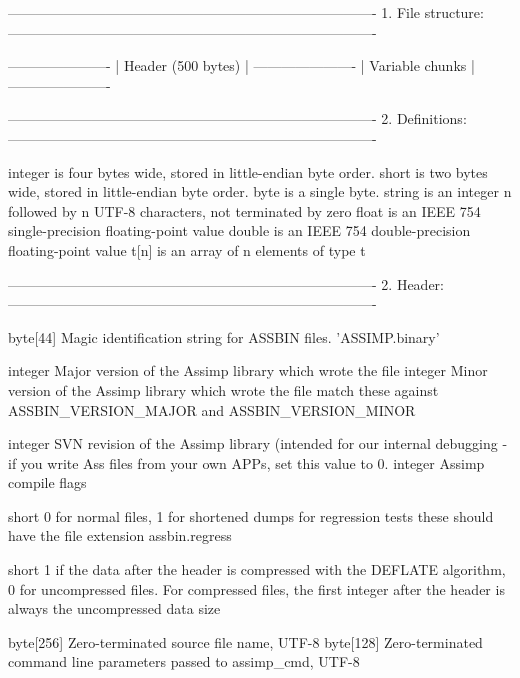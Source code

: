 \begin{DoxyVerb}-------------------------------------------------------------------------------
1. File structure:
-------------------------------------------------------------------------------

----------------------
| Header (500 bytes) |
----------------------
| Variable chunks    |
----------------------

-------------------------------------------------------------------------------
2. Definitions:
-------------------------------------------------------------------------------

integer is four bytes wide, stored in little-endian byte order.
short   is two bytes wide, stored in little-endian byte order.
byte    is a single byte.
string  is an integer n followed by n UTF-8 characters, not terminated by zero
float   is an IEEE 754 single-precision floating-point value 
double  is an IEEE 754 double-precision floating-point value 
t[n]    is an array of n elements of type t

-------------------------------------------------------------------------------
2. Header:
-------------------------------------------------------------------------------

byte[44]    Magic identification string for ASSBIN files.
                'ASSIMP.binary'

integer     Major version of the Assimp library which wrote the file
integer     Minor version of the Assimp library which wrote the file
                match these against ASSBIN_VERSION_MAJOR and ASSBIN_VERSION_MINOR

integer     SVN revision of the Assimp library (intended for our internal
            debugging - if you write Ass files from your own APPs, set this value to 0.
integer     Assimp compile flags

short       0 for normal files, 1 for shortened dumps for regression tests 
                these should have the file extension assbin.regress

short       1 if the data after the header is compressed with the DEFLATE algorithm,
            0 for uncompressed files.
                   For compressed files, the first integer after the header is
                   always the uncompressed data size
                
byte[256]   Zero-terminated source file name, UTF-8
byte[128]   Zero-terminated command line parameters passed to assimp_cmd, UTF-8 


\end{DoxyVerb}

